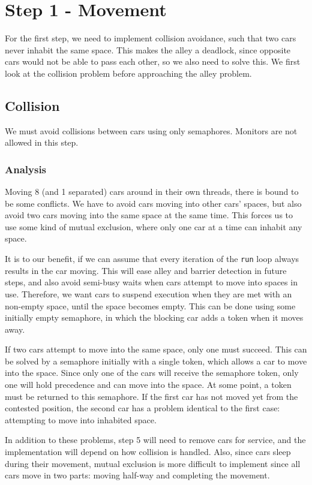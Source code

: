 \section*{Step 1 - Movement}
For the first step, we need to implement collision avoidance, such that two cars never inhabit the same space. This makes the alley a deadlock, since opposite cars would not be able to pass each other, so we also need to solve this. We first look at the collision problem before approaching the alley problem.

\subsection*{Collision}
We must avoid collisions between cars using only semaphores. Monitors are not allowed in this step.

\subsubsection*{Analysis}
Moving 8 (and 1 separated) cars around in their own threads, there is bound to be some conflicts. We have to avoid cars moving into other cars' spaces, but also avoid two cars moving into the same space at the same time. This forces us to use some kind of mutual exclusion, where only one car at a time can inhabit any space.

It is to our benefit, if we can assume that every iteration of the \texttt{run} loop always results in the car moving. This will ease alley and barrier detection in future steps, and also avoid semi-busy waits when cars attempt to move into spaces in use. Therefore, we want cars to suspend execution when they are met with an non-empty space, until the space becomes empty. This can be done using some initially empty semaphore, in which the blocking car adds a token when it moves away.

If two cars attempt to move into the same space, only one must succeed. This can be solved by a semaphore initially with a single token, which allows a car to move into the space. Since only one of the cars will receive the semaphore token, only one will hold precedence and can move into the space. At some point, a token must be returned to this semaphore. If the first car has not moved yet from the contested position, the second car has a problem identical to the first case: attempting to move into inhabited space.

In addition to these problems, step 5 will need to remove cars for service, and the implementation will depend on how collision is handled. Also, since cars sleep during their movement, mutual exclusion is more difficult to implement since all cars move in two parts: moving half-way and completing the movement.

